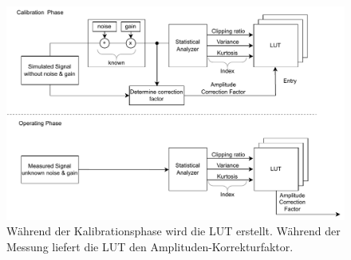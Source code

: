 %

\begin{figure}[th!]
	\centering
	\includegraphics[width=.9\textwidth]{../img/factor.pdf}
	\caption{Während der Kalibrationsphase wird die LUT erstellt. Während der Messung liefert die LUT den Amplituden-Korrekturfaktor.}
	\label{fig:factor_eval} 
\end{figure}

